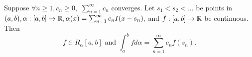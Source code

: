 \begin{theorem} \leavevmode \\
    \label{Thm6.16}
    Suppose $\forall n \geq 1, c_n \geq 0,$ $\sum_{n=1}^{\infty}c_n$ converges. Let $s_1 < s_2< ... $ be points in $(a,b), \alpha:[a,b] \to \mathbb{R}, \alpha(x) = \sum_{n=1}^{\infty} c_n I(x-s_n),$ and $f:[a,b] \to \mathbb{R}$ be continuous. Then
    $$f\in R_\alpha[a,b] \text{ and } \int_a^bf d \alpha = \sum_{n=1}^{\infty}c_nf(s_n).$$
\end{theorem}
